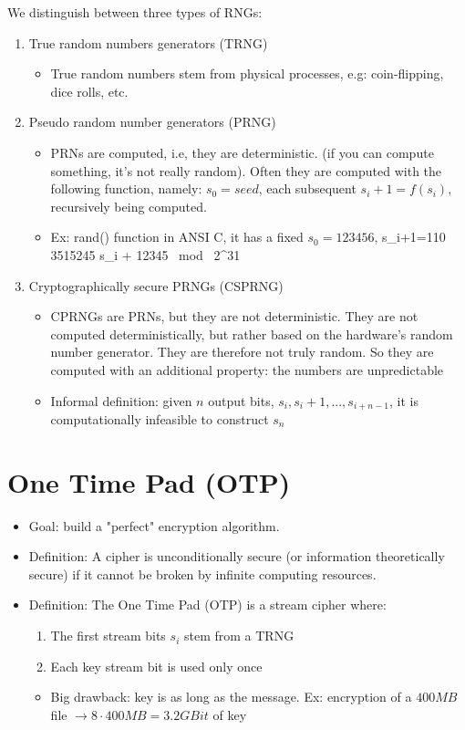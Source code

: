 \documentclass[a4paper]{article}
\begin{document}
We distinguish between three types of RNGs:
\begin{enumerate}
\item
    True random numbers generators (TRNG)
        \begin{itemize}
    \item True random numbers stem from physical processes, e.g: coin-flipping, dice rolls, etc.
  \end{itemize}
\item
    Pseudo random number generators (PRNG)
    \begin{itemize}
        \item  PRNs are computed, i.e, they are deterministic. (if you can compute something, it's not really random). Often they are computed with the following function, namely: $s_0 = seed$, each subsequent $s_i+1=f(s_i)$, recursively being computed.
    \item Ex: rand() function in ANSI C, it has a fixed $s_0 = 123456$, s_{i+1}=110 3515245 s_i + 12345 \ mod \ 2^31 
    \end{itemize}
\item
    Cryptographically secure PRNGs (CSPRNG)
    \begin{itemize}
        \item
            CPRNGs are PRNs, but they are not deterministic. They are not computed deterministically, but rather based on the hardware's random number generator. They are therefore not truly random. So they are computed with an additional property: the numbers are unpredictable 
        \item
            Informal definition: given $n$ output bits, $s_i, s_i + 1, ..., s_{i+n-1}$, it is computationally infeasible to construct $s_n$
    \end{itemize}
\end{enumerate}

\section{One Time Pad (OTP)}
\begin{itemize}
    \item Goal: build a "perfect" encryption algorithm.
    \item Definition: A cipher is unconditionally secure (or information theoretically secure) if it cannot be broken by infinite computing resources.
    \item Definition: The One Time Pad (OTP) is a stream cipher where:
        \begin{enumerate}
        \item
            The first stream bits $s_i$ stem from a TRNG
        \item
            Each key stream bit is used only once
        \end{enumerate}
        \begin{itemize}
            \item
                Big drawback: key is as long as the message. Ex: encryption of a $400MB$ file $\rightarrow 8 \cdot 400MB = 3.2GBit$ of key
        \end{itemize}
\end{itemize}
\end{document}
